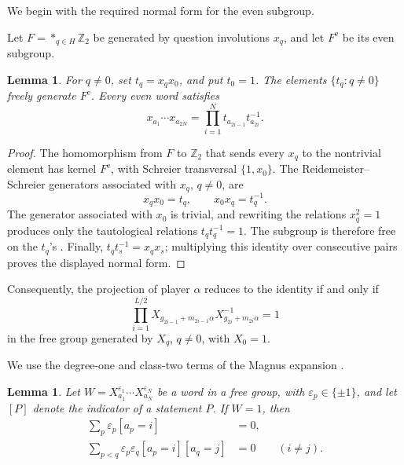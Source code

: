 \documentclass[11pt]{article}
\newtheorem{lemma}[theorem]{Lemma}
\theoremstyle{definition}
\theoremstyle{remark}
\numberwithin{equation}{section}
\begin{document}
We begin with the required normal form for the even subgroup.

Let \(F=\ast_{q\in H}\mathbb Z_2\) be generated by question involutions
\(x_q\), and let \(F^{\mathrm e}\) be its even subgroup.

\begin{lemma}\label{lem:even-subgroup}
For \(q\ne0\), set \(t_q=x_qx_0\), and put \(t_0=1\).  The elements
\(\{t_q:q\ne0\}\) freely generate \(F^{\mathrm e}\).  Every even word
satisfies
\[
  x_{a_1}\cdots x_{a_{2N}}
  =
  \prod_{i=1}^N t_{a_{2i-1}}t_{a_{2i}}^{-1}.
\]
\end{lemma}

\begin{proof}
The homomorphism from \(F\) to \(\mathbb Z_2\) that sends every \(x_q\) to
the nontrivial element has kernel \(F^{\mathrm e}\), with Schreier transversal
\(\{1,x_0\}\).  The Reidemeister--Schreier generators associated with
\(x_q\), \(q\ne0\), are
\[
  x_qx_0=t_q,
  \qquad
  x_0x_q=t_q^{-1}.
\]
The generator associated with \(x_0\) is trivial, and rewriting the
relations \(x_q^2=1\) produces only the tautological relations
\(t_qt_q^{-1}=1\).  The subgroup is therefore free on the \(t_q\)'s
\cite{MagnusKarrassSolitar1976}.  Finally,
\(t_qt_s^{-1}=x_qx_s\); multiplying this identity over consecutive pairs
proves the displayed normal form.
\end{proof}

Consequently, the projection of player \(\alpha\) reduces to the identity
if and only if
\begin{equation}\label{eq:player-normal-form}
  \prod_{i=1}^{L/2}
  X_{g_{2i-1}+m_{2i-1}\alpha}
  X_{g_{2i}+m_{2i}\alpha}^{-1}
  =1
\end{equation}
in the free group generated by \(X_q\), \(q\ne0\), with \(X_0=1\).

We use the degree-one and class-two terms of the Magnus expansion
\cite{Magnus1937,MagnusKarrassSolitar1976}.

\begin{lemma}\label{lem:magnus-conditions}
Let \(W=X_{a_1}^{\varepsilon_1}\cdots
X_{a_N}^{\varepsilon_N}\) be a word in a free group, with
\(\varepsilon_p\in\{\pm1\}\), and let \([P]\) denote the indicator of a
statement \(P\).  If \(W=1\), then
\begin{align}
  \sum_p\varepsilon_p[a_p=i]&=0,
  \label{eq:magnus-one}\\
  \sum_{p<q}\varepsilon_p\varepsilon_q
  [a_p=i][a_q=j]&=0
  \qquad(i\ne j).
  \label{eq:magnus-two}
\end{align}
\end{lemma}
\end{document}
